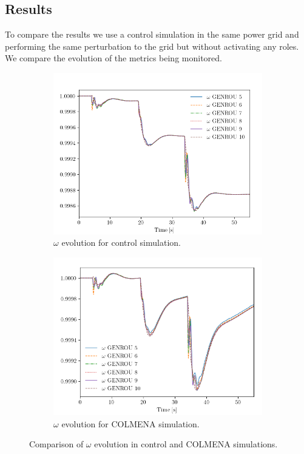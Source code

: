 \documentclass{article}
\begin{document}
\subsection{Results}

To compare the results we use a control simulation in the same power grid and performing the same perturbation to the grid but without activating any roles. We compare the evolution of the metrics being monitored.
\begin{figure}[h!]
    \centering
    \begin{subfigure}[t]{0.48\textwidth}
        \centering
        \includegraphics[width=\linewidth]{plots/control_omega.png}
        \caption{$\omega$ evolution for control simulation.}
        \label{fig:image1}
    \end{subfigure}
    \hfill
    \begin{subfigure}[t]{0.48\textwidth}
        \centering
        \includegraphics[width=\linewidth]{plots/colmena_omega.png}
        \caption{$\omega$ evolution for COLMENA simulation.}
        \label{fig:image2}
    \end{subfigure}
    \caption{Comparison of $\omega$ evolution in control and COLMENA simulations.}
    \label{fig:two_images}
\end{figure}
\end{document}
